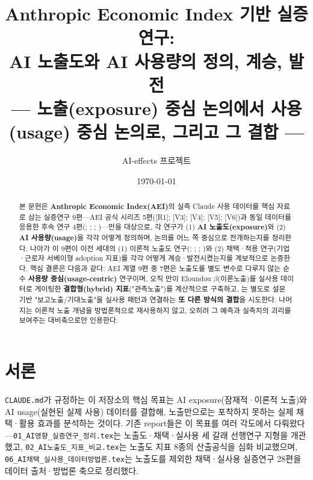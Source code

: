 \documentclass[11pt]{article}
\title{Anthropic Economic Index 기반 실증연구:\\[1mm]
AI 노출도와 AI 사용량의 정의, 계승, 발전\\[2mm]
\large --- 노출(exposure) 중심 논의에서 사용(usage) 중심 논의로, 그리고 그 결합 ---}
\author{AI-effects 프로젝트}
\date{\today}
\begin{document}
\maketitle

\begin{abstract}
\noindent 본 문헌은 \textbf{Anthropic Economic Index(AEI)}의 실측 Claude 사용 데이터를 핵심 자료로 삼는 실증연구 9편—AEI 공식 시리즈 5편(\citealp{handa-2025-which-economic-tasks-are}[R1]; \citealp{appel-2025-uneven-geographic-and-enterprise-ai}[V3]; \citealp{appel-2026-economic-primitives}[V4]; \citealp{massenkoff-2026-learning-curves}[V5]; \citealp{massenkoff-2026-cadences}[V6])과 동일 데이터를 응용한 후속 연구 4편(\citealp{tamkin-2025-estimating-ai-productivity-gains-from}; \citealp{massenkoff-2026-labor-market-impacts-of-ai}; \citealp{fan-2026-what-countries-use-ai-and}; \citealp{fan-2026-aggregate-gains-from-ai})—만을 대상으로, 각 연구가 (1) \textbf{AI 노출도(exposure)}와 (2) \textbf{AI 사용량(usage)}을 각각 어떻게 정의하며, 논의를 어느 쪽 중심으로 전개하는지를 정리한다. 나아가 이 9편이 이전 세대의 (1) 이론적 노출도 연구(\citealp{felten-2021-occupational-industry-and-geographic-exposure}; \citealp{felten-2023-how-will-language-modelers-like-chatgpt}; \citealp{webb-2020-impact-artificial-intelligence-labor}; \citealp{eloundou-2023-gpts-are-gpts-an-early})와 (2) 채택·적용 연구(기업·근로자 서베이형 adoption 지표)를 각각 어떻게 계승·발전시켰는지를 계보적으로 논증한다. 핵심 결론은 다음과 같다: AEI 계열 9편 중 7편은 노출도를 별도 변수로 다루지 않는 순수 \textbf{사용량 중심(usage-centric)} 연구이며, 오직 \citet{massenkoff-2026-labor-market-impacts-of-ai}만이 Eloundou $\beta$(이론노출)를 실사용 데이터로 게이팅한 \textbf{결합형(hybrid) 지표}("관측노출")를 계산적으로 구축하고, \citet{massenkoff-2026-cadences}는 별도로 설문 기반 "보고노출/기대노출"을 실사용 패턴과 연결하는 \textbf{또 다른 방식의 결합}을 시도한다. 나머지는 이론적 노출 개념을 방법론적으로 재사용하지 않고, 오히려 그 예측과 실측치의 괴리를 보여주는 대비축으로만 인용한다.
\end{abstract}

\tableofcontents

\section{서론}

\texttt{CLAUDE.md}가 규정하는 이 저장소의 핵심 목표는 AI exposure(잠재적·이론적 노출)와 AI usage(실현된 실제 사용) 데이터를 결합해, 노출만으로는 포착하지 못하는 실제 채택·활용 효과를 분석하는 것이다. 기존 report들은 이 목표를 여러 각도에서 다뤄왔다—\texttt{01\_AI영향\_실증연구\_정리.tex}는 노출도·채택·실사용 세 갈래 선행연구 지형을 개관했고, \texttt{02\_AI노출도\_지표\_비교.tex}는 노출도 지표 8종의 산출공식을 심화 비교했으며, \texttt{06\_AI채택\_실사용\_데이터방법론.tex}는 노출도를 제외한 채택·실사용 실증연구 28편을 데이터 출처·방법론 축으로 정리했다.
\end{document}
